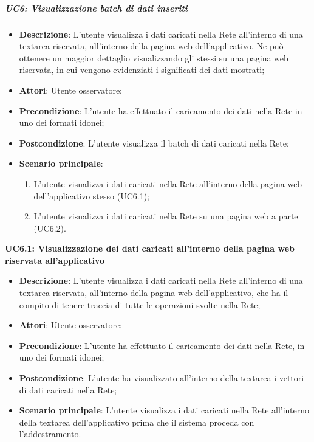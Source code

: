 \subparagraph{UC6: Visualizzazione batch di dati inseriti}\mbox{}
\label{UC6: Visualizzazione batch di dati inseriti}
\noindent
\begin{itemize}
\item \textbf{Descrizione}: L'utente visualizza i dati caricati nella Rete all'interno di una textarea riservata, all'interno della pagina web dell'applicativo. Ne pu\`o ottenere un maggior dettaglio visualizzando gli stessi su una pagina web riservata, in cui vengono evidenziati i significati dei dati mostrati;
\item \textbf{Attori}: Utente osservatore;
\item \textbf{Precondizione}: L'utente ha  effettuato il caricamento dei dati nella Rete in uno dei formati idonei;
\item \textbf{Postcondizione}: L'utente visualizza il batch di dati caricati nella Rete;
\item \textbf{Scenario principale}:
\begin{enumerate}
\item L'utente visualizza i dati caricati nella Rete all'interno della pagina web dell'applicativo stesso (UC6.1);
\item L'utente visualizza i dati caricati nella Rete su una pagina web a parte (UC6.2).
\end{enumerate}
\end{itemize}

\textbf{UC6.1: Visualizzazione dei dati caricati all'interno della pagina web riservata all'applicativo}\mbox{}
\label{UC6.1: Visualizzazione dei dati caricati all'interno della pagina web riservata all'applicativo}
\noindent
\begin{itemize}
\item \textbf{Descrizione}: L'utente visualizza i dati caricati nella Rete all'interno di una textarea riservata, all'interno della pagina web dell'applicativo, che ha il compito di tenere traccia di tutte le operazioni svolte nella Rete;
\item \textbf{Attori}: Utente osservatore;
\item \textbf{Precondizione}: L'utente ha  effettuato il caricamento dei dati nella Rete, in uno dei formati idonei;
\item \textbf{Postcondizione}: L'utente ha visualizzato all'interno della textarea i vettori di dati caricati nella Rete;
\item \textbf{Scenario principale}: L'utente visualizza i dati caricati nella Rete all'interno della textarea dell'applicativo prima che il sistema proceda con l'addestramento.
\end{itemize}

